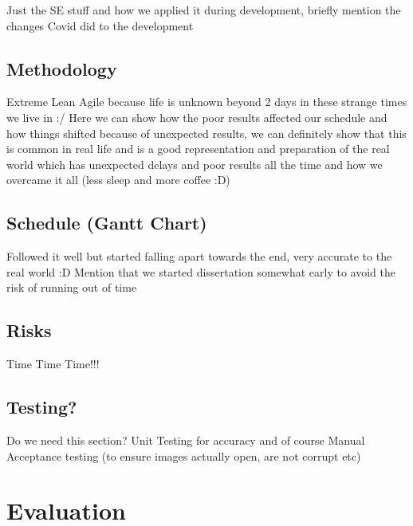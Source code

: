 \documentclass[12pt]{article}
\begin{document}
    Just the SE stuff and how we applied it during development, briefly mention the changes Covid did to the development

    \subsection{Methodology}\label{subsec:methodology}

    Extreme Lean Agile because life is unknown beyond 2 days in these strange times we live in :/
    \linebreak
    Here we can show how the poor results affected our schedule and how things shifted because of unexpected results,
    we can definitely show that this is common in real life and is a good representation and preparation of the real world
    which has unexpected delays and poor results all the time and how we overcame it all (less sleep and more coffee :D)

    \subsection{Schedule (Gantt Chart)}\label{subsec:schedule-(gantt-chart)}

    Followed it well but started falling apart towards the end, very accurate to the real world :D
    \linebreak
    Mention that we started dissertation somewhat early to avoid the risk of running out of time

    \subsection{Risks}\label{subsec:risks}

    Time Time Time!!!

    \subsection{Testing?}\label{subsec:testing?}

    Do we need this section?
    \linebreak
    Unit Testing for accuracy and of course Manual Acceptance testing (to ensure images actually open, are not corrupt etc)

    \pagebreak


    \section{Evaluation}\label{sec:evaluation}
\end{document}

